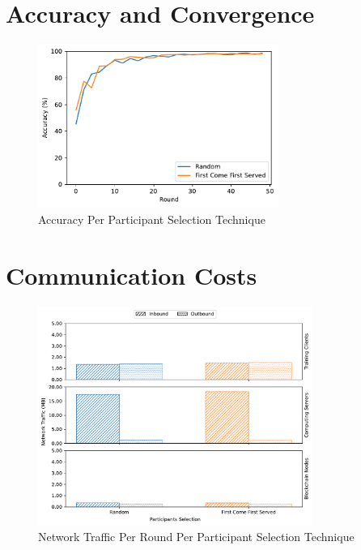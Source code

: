 \section{Accuracy and Convergence}

\begin{figure}[!ht]
    \centering
    \centering
    \includegraphics[width=0.7\textwidth]{graphics/selection/accuracy.pdf}
    \caption{Accuracy Per Participant Selection Technique}
    \label{fig:accuracy_selection}
\end{figure}

\section{Communication Costs}

\begin{figure}[!ht]
    \centering
    \centering
    \includegraphics[width=0.8\textwidth]{graphics/selection/net.pdf}
    \caption{Network Traffic Per Round Per Participant Selection Technique}
    \label{fig:net_selection}
\end{figure}

